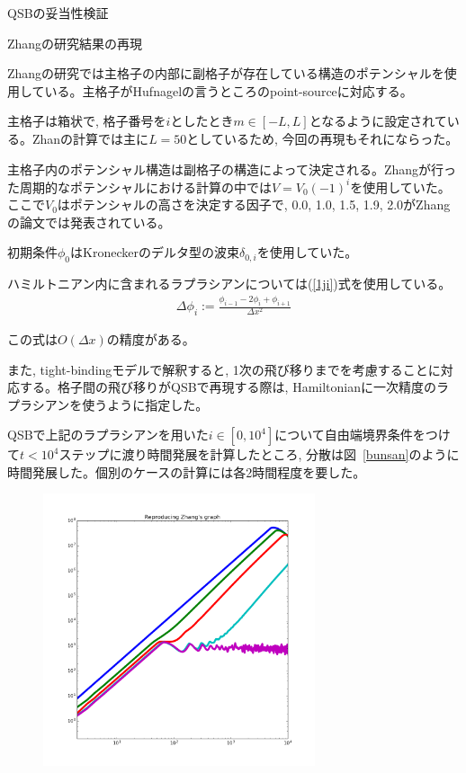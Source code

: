 \documentclass[a4paper, lualatex]{bxjsarticle}
\newcommand{\eref}[1]{(\ref{#1})式}
\newcommand{\fref}[1]{図~\ref{#1}}
\begin{document}
\begin{section}{QSBの妥当性検証}
    \begin{subsection}{Zhangの研究結果の再現}
        \par Zhangの研究では主格子の内部に副格子が存在している構造のポテンシャルを使用している。主格子がHufnagelの言うところのpoint-sourceに対応する。
        \par 主格子は箱状で, 格子番号を$i$としたとき$m\in [-L, L]$となるように設定されている。Zhanの計算では主に$L=50$としているため, 今回の再現もそれにならった。
        \par 主格子内のポテンシャル構造は副格子の構造によって決定される。Zhangが行った周期的なポテンシャルにおける計算の中では$V=V_0 (-1)^i$を使用していた。ここで$V_0$はポテンシャルの高さを決定する因子で, 0.0, 1.0, 1.5, 1.9, 2.0がZhangの論文では発表されている。
        \par 初期条件$\phi_0$はKroneckerのデルタ型の波束$\delta_{0, i}$を使用していた。
        \par ハミルトニアン内に含まれるラプラシアンについては\eref{1ji}を使用している。
        \begin{align}
            \Delta \phi_i := \frac{\phi_{i-1} - 2\phi_{i} + \phi_{i+1}}{\varDelta x^2}\label{1ji}
        \end{align}
        \par この式は$O(\varDelta x)$の精度がある\cite{Carnahan}。
        \par また, tight-bindingモデルで解釈すると, 1次の飛び移りまでを考慮することに対応する。格子間の飛び移りがQSBで再現する際は, Hamiltonianに一次精度のラプラシアンを使うように指定した。
        \par QSBで上記のラプラシアンを用いた$i\in [0, 10^4]$について自由端境界条件をつけて$t<10^4$ステップに渡り時間発展を計算したところ, 分散は\fref{bunsan}のように時間発展した。個別のケースの計算には各2時間程度を要した。
         \begin{figure}[h]
            \centering
            \includegraphics[width=8cm]{zhang.png}

\end{figure}
\end{subsection}
\end{section}
\end{document}

